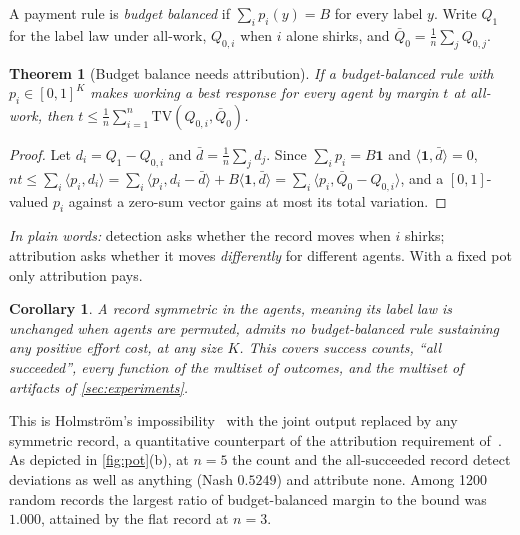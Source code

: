\documentclass[sigconf,anonymous,acmthm=false]{acmart}
\theoremstyle{acmplain}
\newtheorem{theorem}{Theorem}
\newtheorem{corollary}{Corollary}
\theoremstyle{acmdefinition}
\newcommand{\plain}[1]{\par\smallskip\noindent\textit{In plain words:} #1\par\smallskip}
\newcommand{\TV}{\mathrm{TV}}
\begin{document}
A payment rule is \emph{budget balanced} if $\sum_ip_i(y)=B$ for every label $y$. Write
$Q_1$ for the label law under all-work, $Q_{0,i}$ when $i$ alone shirks, and
$\bar Q_0=\frac1n\sum_jQ_{0,j}$.

\begin{theorem}[Budget balance needs attribution]\label{thm:bb}
If a budget-balanced rule with $p_i\in[0,1]^K$ makes working a best response for every
agent by margin $t$ at all-work, then
$t\le\frac1n\sum_{i=1}^n\TV(Q_{0,i},\bar Q_0)$.
\end{theorem}

\begin{proof}
Let $d_i=Q_1-Q_{0,i}$ and $\bar d=\frac1n\sum_jd_j$. Since $\sum_ip_i=B\mathbf1$ and
$\langle\mathbf1,\bar d\rangle=0$,
$nt\le\sum_i\langle p_i,d_i\rangle=\sum_i\langle p_i,d_i-\bar d\rangle+B\langle\mathbf1,\bar d\rangle=\sum_i\langle p_i,\bar Q_0-Q_{0,i}\rangle$,
and a $[0,1]$-valued $p_i$ against a zero-sum vector gains at most its total variation.
\end{proof}

\plain{detection asks whether the record moves when $i$ shirks; attribution asks whether it
moves \emph{differently} for different agents. With a fixed pot only attribution pays.}

\begin{corollary}\label{cor:bb}
A record symmetric in the agents, meaning its label law is unchanged when agents are
permuted, admits no budget-balanced rule sustaining any positive effort cost, at any size
$K$. This covers success counts, ``all succeeded'', every function of the multiset of
outcomes, and the multiset of artifacts of \cref{sec:experiments}.
\end{corollary}

This is Holmstr\"om's impossibility~\cite{holmstrom1982teams} with the joint output
replaced by any symmetric record, a quantitative counterpart of the attribution
requirement of~\cite{legrosmatthews1993,rahmanobara2010}. As depicted in
\cref{fig:pot}(b), at $n=5$ the count and the all-succeeded record detect deviations as well
as anything (Nash $0.5249$) and attribute none. Among 1200 random records the largest ratio
of budget-balanced margin to the bound was $1.000$, attained by the flat record at $n=3$.
\end{document}
